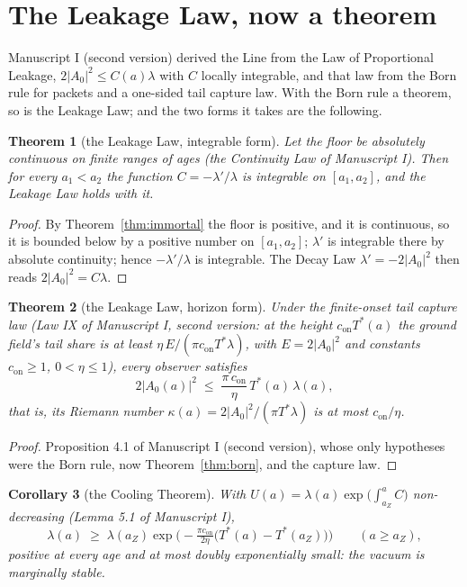 \documentclass[11pt]{article}
\newtheorem{theorem}{Theorem}[section]
\newtheorem{corollary}[theorem]{Corollary}
\theoremstyle{definition}
\theoremstyle{remark}
\newcommand{\Tst}{T^{*}}
\newcommand{\con}{c_{\mathrm{on}}}
\begin{document}
\section{The Leakage Law, now a theorem}

Manuscript I (second version) derived the Line from the Law of Proportional Leakage, $2|A_0|^2\le C(a)\lambda$ with $C$ locally integrable, and that law from the Born rule for packets and a one-sided tail capture law. With the Born rule a theorem, so is the Leakage Law; and the two forms it takes are the following.

\begin{theorem}[the Leakage Law, integrable form]\label{thm:leak}
Let the floor be absolutely continuous on finite ranges of ages (the Continuity Law of Manuscript I). Then for every $a_1<a_2$ the function $C=-\lambda'/\lambda$ is integrable on $[a_1,a_2]$, and the Leakage Law holds with it.
\end{theorem}

\begin{proof}
By Theorem~\ref{thm:immortal} the floor is positive, and it is continuous, so it is bounded below by a positive number on $[a_1,a_2]$; $\lambda'$ is integrable there by absolute continuity; hence $-\lambda'/\lambda$ is integrable. The Decay Law $\lambda'=-2|A_0|^2$ then reads $2|A_0|^2=C\lambda$.
\end{proof}

\begin{theorem}[the Leakage Law, horizon form]\label{thm:leakT}
Under the finite-onset tail capture law (Law IX of Manuscript I, second version: at the height $\con\Tst(a)$ the ground field's tail share is at least $\eta\,E/(\pi\con\Tst\lambda)$, with $E=2|A_0|^2$ and constants $\con\ge1$, $0<\eta\le1$), every observer satisfies
\[
2|A_0(a)|^2\;\le\;\frac{\pi\,\con}{\eta}\,\Tst(a)\,\lambda(a),
\]
that is, its Riemann number $\kappa(a)=2|A_0|^2/(\pi\Tst\lambda)$ is at most $\con/\eta$.
\end{theorem}

\begin{proof}
Proposition 4.1 of Manuscript I (second version), whose only hypotheses were the Born rule, now Theorem~\ref{thm:born}, and the capture law.
\end{proof}

\begin{corollary}[the Cooling Theorem]\label{cor:cool}
With $U(a)=\lambda(a)\exp\big(\int_{a_Z}^aC\big)$ non-decreasing (Lemma 5.1 of Manuscript I),
\[
\lambda(a)\;\ge\;\lambda(a_Z)\exp\Big(-\tfrac{\pi\con}{2\eta}\big(\Tst(a)-\Tst(a_Z)\big)\Big)\qquad(a\ge a_Z),
\]
positive at every age and at most doubly exponentially small: the vacuum is marginally stable.
\end{corollary}
\end{document}
